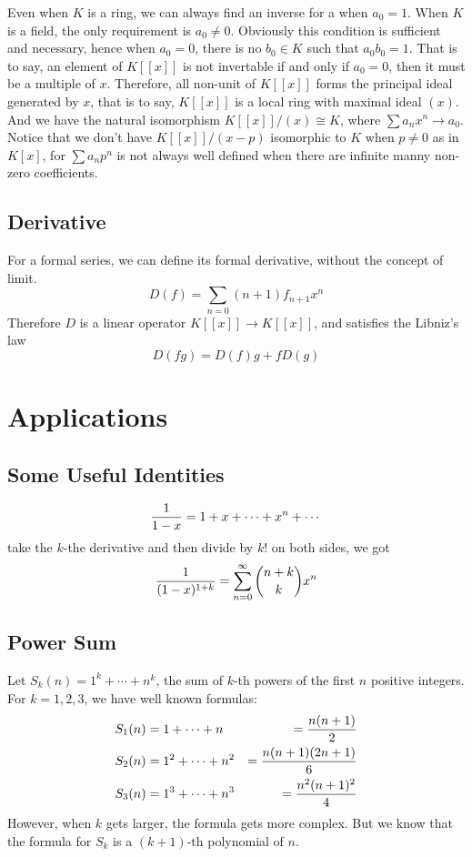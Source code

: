 \documentclass{article}
\begin{document}
Even when $K$ is a ring, we can always find an inverse for a
when $a_0 = 1$.
When $K$ is a field, the only requirement is $a_0 \neq 0$.
Obviously this condition is sufficient and necessary,
hence when $a_0 = 0$, there is no $b_0 \in K$ such that $a_0 b_0 = 1$.
That is to say, an element of $K[[x]]$ is not invertable if and only if $a_0 = 0$,
then it must be a multiple of $x$.
Therefore, all non-unit of $K[[x]]$ forms the principal ideal generated by $x$,
that is to say, $K[[x]]$ is a local ring with maximal ideal $(x)$.
And we have the natural isomorphism $K[[x]]/(x) \cong K$, where $\sum a_n x^n \to a_0$.
Notice that we don't have $K[[x]]/(x - p)$ isomorphic to $K$ when $p \neq 0$ as in $K[x]$,
for $\sum a_n p^n$ is not always well defined when there are infinite manny non-zero coefficients.


\subsection{Derivative}
For a formal series, we can define its formal derivative, without the concept of limit.
$$D(f) = \sum_{n=0} (n + 1) f_{n + 1} x^n$$
Therefore $D$ is a linear operator $K[[x]] \to K[[x]]$, and satisfies the Libniz's law
$$D(fg) = D(f) g + f D(g)$$

\section{Applications}
\subsection{Some Useful Identities}
$${1 \over 1 - x} = 1 + x + \cdots + x^n + \cdots$$
take the $k$-the derivative and then divide by $k!$ on both sides,
we got
$${1 \over (1 - x)^{1 + k}} = \sum_{n=0}^\infty {n + k\choose k} x^n$$

\subsection{Power Sum}
Let $S_k(n) = 1^k + \cdots + n^k$, the sum of $k$-th powers of the first $n$
positive integers. For $k = 1, 2, 3$, we have well known formulas:
\begin{align}
S_1(n) &= 1 + \cdots + n &= {n(n+1) \over 2} \\
S_2(n) &= 1^2 + \cdots + n^2 &= {n(n + 1)(2n + 1) \over 6} \\
S_3(n) &= 1^3 + \cdots + n^3 &= {n^2(n + 1)^2 \over 4}
\end{align}
However, when $k$ gets larger, the formula gets more complex.
But we know that the formula for $S_k$ is a $(k + 1)$-th polynomial of $n$.
\end{document}
